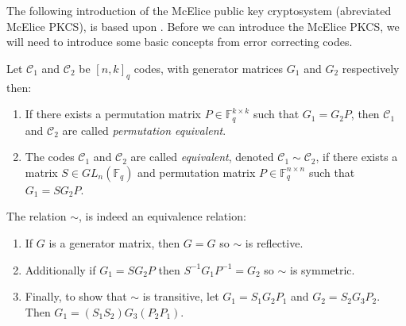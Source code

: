 The following introduction of the McElice public key cryptosystem (abreviated McElice PKCS), is based upon \cite{r6}. Before we can introduce the McElice PKCS, we will need to introduce some basic concepts from error correcting codes.

\begin{definition}
  Let $\mathcal{C}_1$ and $\mathcal{C}_2$ be $[n, k]_{q}$ codes, with generator matrices $G_1$ and $G_2$ respectively then:
  \begin{enumerate}
    \item If there exists a permutation matrix $P \in  \mathbb{F}_{q}^{k \times k}$ such that $G_1 = G_{2}P$, then $\mathcal{C}_1$ and $\mathcal{C}_{2}$ are called \textit{permutation equivalent}.
    \item The codes $\mathcal{C}_1$ and $\mathcal{C}_2$ are called \textit{equivalent}, denoted $\mathcal{C}_1 \sim \mathcal{C}_{2}$, if there exists a matrix $S \in GL_n(\mathbb{F}_q)$ and permutation matrix $P \in \mathbb{F}_q^{n \times n}$ such that $G_1 = S G_2P$.
  \end{enumerate}
\end{definition}
\begin{remark}
  The relation $\sim$, is indeed an equivalence relation:
  \begin{enumerate}
\item If $G$ is a generator matrix, then $G = G$ so $\sim$ is reflective.
\item Additionally if $G_1 = SG_2P$  then $S^{-1}G_1P^{-1} = G_2$ so $\sim$ is symmetric.
\item Finally, to show that $\sim$ is transitive, let $G_1 = S_1G_2P_1$ and $G_2 = S_2G_{3}P_2$. Then $G_1 = (S_1S_2)G_3(P_2P_1)$.
  \end{enumerate}
\end{remark}

